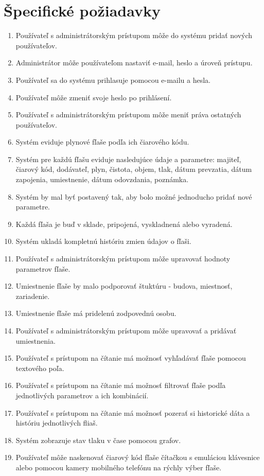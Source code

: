 \documentclass[hreffootnote]{zah}
\begin{document}
\cleardoublepage
\section{Špecifické požiadavky}

\begin{enumerate}
\item Používateľ s administrátorským prístupom môže do systému pridať nových používateľov.
\item Administrátor môže používateľom nastaviť e-mail, heslo a úroveň prístupu.
\item Používateľ sa do systému prihlasuje pomocou e-mailu a hesla.
\item Používateľ môže zmeniť svoje heslo po prihlásení.
\item Používateľ s administrátorským prístupom môže meniť práva ostatných používateľov.
\item Systém eviduje plynové fľaše podľa ich čiarového kódu.
\item Systém pre každú fľašu eviduje nasledujúce údaje a parametre: majiteľ, čiarový kód, dodávateľ, plyn, čistota, objem, tlak, dátum prevzatia, dátum zapojenia, umiestnenie, dátum odovzdania, poznámka.
\item Systém by mal byť postavený tak, aby bolo možné jednoducho pridať nové parametre.
\item Každá fľaša je buď v sklade, pripojená, vyskladnená alebo vyradená.
\item Systém ukladá kompletnú históriu zmien údajov o fľaši.
\item Používateľ s administrátorským prístupom môže upravovať hodnoty parametrov fľaše.
\item Umiestnenie fľaše by malo podporovať štuktúru - budova, miestnosť, zariadenie.
\item Umiestnenie fľaše má pridelenú zodpovednú osobu.
\item Používateľ s administrátorským prístupom môže upravovať a pridávať umiestnenia.

\item Používateľ s prístupom na čítanie má možnosť vyhľadávať fľaše pomocou textového poľa.
\item Používateľ s prístupom na čítanie má možnosť filtrovať fľaše podľa jednotlivých parametrov a ich kombinácií.
\item Používateľ s prístupom na čítanie má možnosť pozerať si historické dáta a históriu jednotlivých fliaš.
\item Systém zobrazuje stav tlaku v čase pomocou grafov.
\item Používateľ môže naskenovať čiarový kód fľaše čítačkou s emuláciou klávesnice alebo pomocou kamery mobilného telefónu na rýchly výber fľaše.


\end{enumerate}
\end{document}

